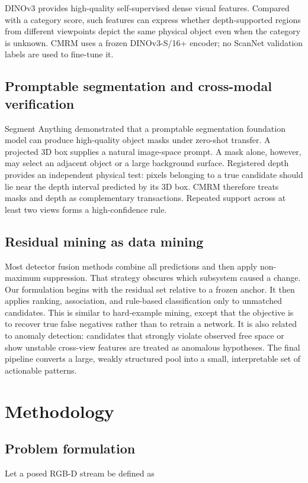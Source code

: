 \documentclass[11pt,a4paper]{article}
\begin{document}
DINOv3 \cite{simeoni2025dinov3} provides high-quality self-supervised dense visual features. Compared with a category score, such features can express whether depth-supported regions from different viewpoints depict the same physical object even when the category is unknown. CMRM uses a frozen DINOv3-S/16+ encoder; no ScanNet validation labels are used to fine-tune it.

\subsection{Promptable segmentation and cross-modal verification}
Segment Anything \cite{kirillov2023sam} demonstrated that a promptable segmentation foundation model can produce high-quality object masks under zero-shot transfer. A projected 3D box supplies a natural image-space prompt. A mask alone, however, may select an adjacent object or a large background surface. Registered depth provides an independent physical test: pixels belonging to a true candidate should lie near the depth interval predicted by its 3D box. CMRM therefore treats masks and depth as complementary transactions. Repeated support across at least two views forms a high-confidence rule.

\subsection{Residual mining as data mining}
Most detector fusion methods combine all predictions and then apply non-maximum suppression. That strategy obscures which subsystem caused a change. Our formulation begins with the residual set relative to a frozen anchor. It then applies ranking, association, and rule-based classification only to unmatched candidates. This is similar to hard-example mining, except that the objective is to recover true false negatives rather than to retrain a network. It is also related to anomaly detection: candidates that strongly violate observed free space or show unstable cross-view features are treated as anomalous hypotheses. The final pipeline converts a large, weakly structured pool into a small, interpretable set of actionable patterns.

\section{Methodology}
\subsection{Problem formulation}
Let a posed RGB-D stream be defined as
\end{document}

